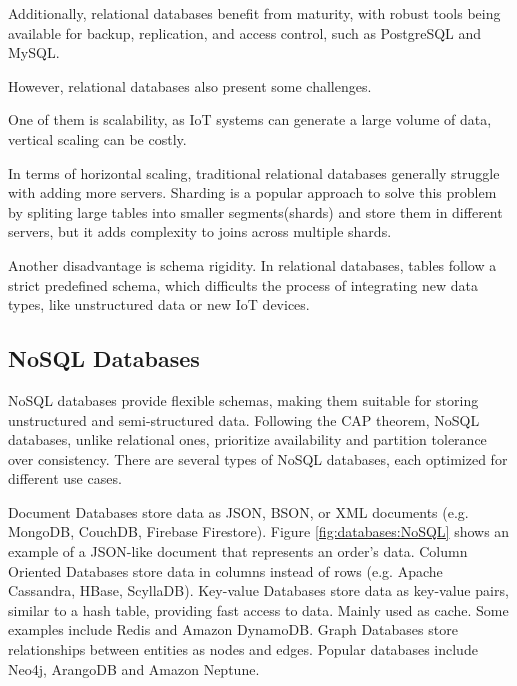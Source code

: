 Additionally, relational databases benefit from maturity, with robust tools being
available for backup, replication, and access control, such as PostgreSQL and MySQL.

However, relational databases also present some challenges.

One of them is scalability, as \gls{IoT} systems can generate a large volume of
data, vertical scaling can be costly\cite{Yadav2024}.

In terms of horizontal scaling, traditional relational databases generally
struggle with adding more servers. Sharding is a popular approach to
solve this problem by spliting large tables into smaller segments(shards)
and store them in different servers, but it adds complexity to joins
across multiple shards\cite{Yadav2024}.

Another disadvantage is schema rigidity.
In relational databases, tables follow a strict predefined schema, which
difficults the process of integrating new data types, like unstructured
data or new \gls{IoT} devices\cite{bdcc7020097}.



\subsection{NoSQL Databases}
\gls{NoSQL} databases provide flexible schemas, making them suitable
for storing unstructured and semi-structured data. Following the \gls{CAP} theorem,
\gls{NoSQL} databases, unlike relational ones, prioritize availability and partition
tolerance over consistency\cite{Yadav2024, bdcc7020097}. There are several types of \gls{NoSQL} databases,
each optimized for different use cases.

Document Databases store data as \gls{JSON}, \gls{BSON}, or \gls{XML} documents (e.g.
MongoDB, CouchDB, Firebase Firestore). Figure \ref{fig:databases:NoSQL}
shows an example of a \gls{JSON}-like document that represents an order's data.
Column Oriented Databases store data in columns instead of rows (e.g.
Apache Cassandra, HBase, ScyllaDB).
Key-value Databases store data as key-value pairs, similar to
a hash table, providing fast access to data. Mainly used as cache. Some
examples include Redis and Amazon DynamoDB.
Graph Databases store relationships between entities as nodes and
edges. Popular databases include Neo4j, ArangoDB and Amazon Neptune\cite{Yadav2024, bdcc7020097}.

